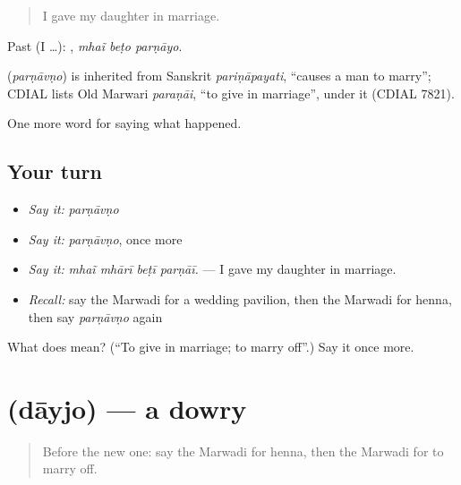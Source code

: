 \begin{quote}
I gave my daughter in marriage.
\end{quote}

Past (I …):   , \emph{mhaĩ beṭo parṇāyo}.

\begin{cousinweb}
\textbf{} (\emph{parṇāvṇo}) is inherited from Sanskrit \emph{pariṇāpayati}, \textquotedblleft{}causes a man to marry\textquotedblright{}; CDIAL lists Old Marwari \emph{paraṇāi}, \textquotedblleft{}to give in marriage\textquotedblright{}, under it (CDIAL 7821).
\end{cousinweb}

\begin{grammarlens}[title={What you've built}]
One more word for saying what happened.
\end{grammarlens}

\subsection*{Your turn}
\begin{itemize}
\raggedright
  \item \emph{Say it:} \emph{parṇāvṇo}
  \item \emph{Say it:} \emph{parṇāvṇo}, once more
  \item \emph{Say it:} \emph{mhaĩ mhārī beṭī parṇāī.} — I gave my daughter in marriage.
  \item \emph{Recall:} say the Marwadi for a wedding pavilion, then the Marwadi for henna, then say \emph{parṇāvṇo} again
\end{itemize}

\begin{tcolorbox}[breakable,colback=teal!4,colframe=teal!35!black,title={Before you move on}]
What does  mean? (\textquotedblleft{}To give in marriage; to marry off\textquotedblright{}.) Say it once more.
\end{tcolorbox}
\section[\texorpdfstring{\mw{दायजो} (dāyjo)}{दायजो (dāyjo)}]{ (dāyjo) — a dowry}

\label{lesson:MW-C248-dayjo}



\begin{quote}
Before the new one: say the Marwadi for henna, then the Marwadi for to marry off.
\end{quote}

